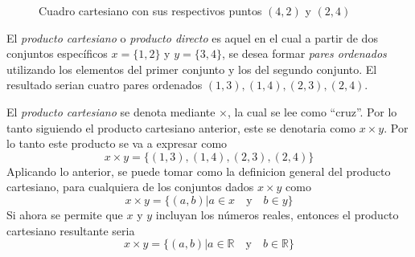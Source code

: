 \begin{figure}[!ht]
    \centering
    \caption{Cuadro cartesiano con sus respectivos puntos \((4 , 2)\) y \((2 , 4)\)}
    \label{cuadro_cartesiano}
\end{figure}



El \textit{producto cartesiano} o \textit{producto directo} es aquel en el cual a partir de dos conjuntos específicos \(x = \{1,2\}\) y \(y = \{3,4\}\), se desea formar \textit{pares ordenados} utilizando los elementos del primer conjunto y los del segundo conjunto. El resultado serian cuatro pares ordenados \((1,3),(1,4),(2,3),(2,4)\).

El \textit{producto cartesiano} se denota mediante \(\times\), la cual se lee como ``cruz''. Por lo tanto siguiendo el producto cartesiano anterior, este se denotaria como \(x\times y\). Por lo tanto este producto se va a expresar como 
\[
x \times y = \{(1,3),(1,4),(2,3),(2,4)\}
\]
Aplicando lo anterior, se puede tomar como la definicion general del producto cartesiano, para cualquiera de los conjuntos dados \(x \times y\) como 
\[
x \times y = \{(a,b) | a \in x \quad \text{y} \quad b \in y\}
\]
Si ahora se permite que \(x\) y \(y\) incluyan los números reales, entonces el producto cartesiano resultante seria
\[
x \times y = \{(a,b) | a \in \mathbb{R} \quad \text{y} \quad b \in \mathbb{R}\}
\]

